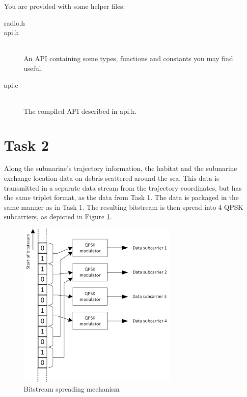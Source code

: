 \documentclass[a4paper]{article}
\begin{document}
You are provided with some helper files:
\begin{description}
	\item[radio.h]
	\item[api.h]
	\,\\ An API containing some types, functions and constants you may find useful.
	\item[api.c]
	\,\\ The compiled API described in \textsf{api.h}.
\end{description}


\section*{Task 2}

Along the submarine's trajectory information, the habitat and the submarine exchange location data on debris scattered around the sea. This data is transmitted in a separate data stream from the trajectory coordinates, but has the same triplet format, as the data from Task 1. The data is packaged in the same manner as in Task 1. The resulting bitstream is then spread into 4 QPSK subcarriers, as depicted in Figure \ref{fig:spread}.
\begin{figure}[h!]
	\centering
	\includegraphics[width=0.7\textwidth]{spread.png}
	\caption{Bitstream spreading mechanism}
	\label{fig:spread}
\end{figure}
\end{document}

